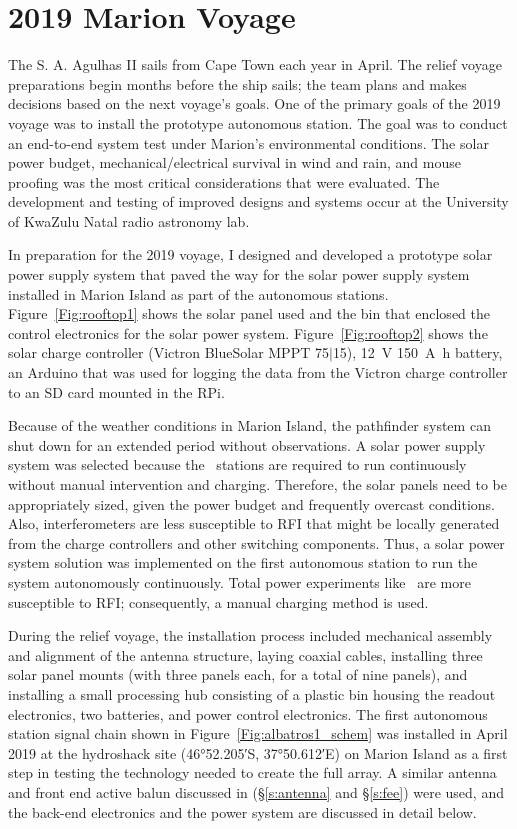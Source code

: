 \section{2019 Marion Voyage}

The S. A. Agulhas II sails from Cape Town each year in April. The relief voyage preparations begin months before the ship sails; the team plans and makes decisions based on the next voyage's goals. One of the primary goals of the 2019 voyage was to install the prototype autonomous station.   The goal was to conduct an end-to-end system test under Marion's environmental conditions. The solar power budget, mechanical/electrical survival in wind and rain, and mouse proofing was the most critical considerations that were evaluated. The development and testing of improved designs and systems occur at the University of KwaZulu Natal radio astronomy lab. 

In preparation for the 2019 voyage, I designed and developed a prototype solar power supply system that paved the way for the solar power supply system installed in Marion Island as part of the autonomous stations. Figure~\ref{Fig:rooftop1} shows the solar panel used and the bin that enclosed the control electronics for the solar power system. Figure~\ref{Fig:rooftop2} shows the solar charge controller (Victron BlueSolar MPPT 75$\vert$15), \SI{12}{\volt} \SI{150}{\ampere \hour} battery, an Arduino that was used for logging the data from the Victron charge controller to an SD card mounted in the RPi. 

Because of the weather conditions in Marion Island, the pathfinder system can shut down for an extended period without observations. A solar power supply system was selected because the \albatros\ stations are required to run continuously without manual intervention and charging. Therefore, the solar panels need to be appropriately sized, given the power budget and frequently overcast conditions. Also, interferometers are less susceptible to RFI that might be locally generated from the charge controllers and other switching components. Thus, a solar power system solution was implemented on the first autonomous station to run the system autonomously continuously. Total power experiments like \prizm\ are more susceptible to RFI; consequently, a manual charging method is used.   

During the relief voyage, the installation process included mechanical assembly and alignment of the antenna structure, laying coaxial cables, installing three solar panel mounts (with three panels each, for a total of nine panels), and installing a small processing hub consisting of a plastic bin housing the readout electronics, two batteries, and power control electronics. The first autonomous station signal chain shown in Figure~\ref{Fig:albatros1_schem} was installed in April 2019 at the hydroshack site (\ang{46;52.205;}S, \ang{37;50.612;}E) on Marion Island as a first step in testing the technology needed to create the full array. A similar antenna and front end active balun discussed in (\S\ref{s:antenna} and \S\ref{s:fee}) were used, and the back-end electronics and the power system are discussed in detail below.

